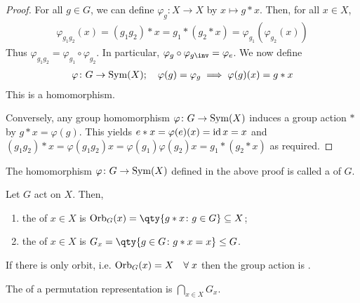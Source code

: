 \begin{proof}
	For all $g \in G$, we can define $\varphi_g \colon X \to X$ by $x \mapsto g \ast x$.
	Then, for all $x \in X$,
	\begin{align*}
		\varphi_{g_1 g_2} (x) = (g_1 g_2) \ast x = g_1 \ast (g_2 \ast x) = \varphi_{g_1}(\varphi_{g_2}(x))
	\end{align*}
	Thus $\varphi_{g_1 g_2} = \varphi_{g_1} \circ \varphi_{g_2}$.
	In particular, $\varphi_g \circ \varphi_{g\inv} = \varphi_e$.
	We now define
	\begin{align*}
		\varphi \colon G \to \operatorname{Sym}(X);\quad \varphi(g) = \varphi_g \implies \varphi(g)(x) = g \ast x
	\end{align*}
	This is a homomorphism.

	Conversely, any group homomorphism $\varphi \colon G \to \operatorname{Sym}(X)$ induces a group action $\ast$ by $g \ast x = \varphi(g)$.
	This yields $e \ast x = \varphi(e)(x) = \operatorname{id} x = x$ and $(g_1 g_2) \ast x = \varphi(g_1 g_2) x = \varphi(g_1) \varphi(g_2) x = g_1 \ast (g_2 \ast x)$ as required.
\end{proof}

\begin{definition}
	The homomorphism $\varphi \colon G \to \operatorname{Sym}(X)$ defined in the above proof is called a  of $G$.
\end{definition}

\begin{definition}
	Let $G$ act on $X$.
	Then,
	\begin{enumerate}
		\item the  of $x \in X$ is $\Orb_G(x) = \qty{g \ast x \colon g \in G} \subseteq X$;
		\item the  of $x \in X$ is $G_x = \qty{g \in G \colon g \ast x = x} \leq G$.
	\end{enumerate}
\end{definition}

\begin{definition}
	If there is only orbit, i.e. $\operatorname{Orb}_G(x) = X \quad \forall \; x$ then the group action is .
\end{definition} 

\begin{definition}[Kernel]
	The  of a permutation representation is $\bigcap_{x \in X} G_x$.
\end{definition} 

